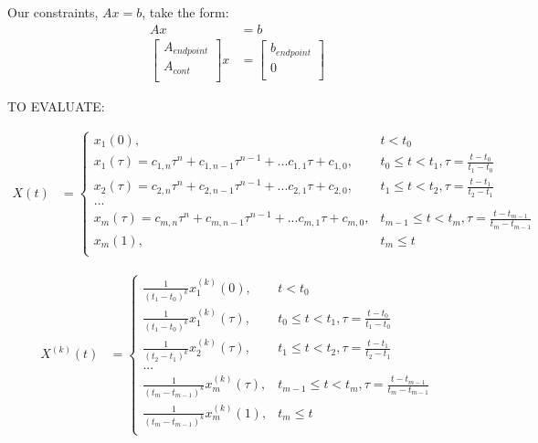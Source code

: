 \documentclass[11pt]{article}
\begin{document}
Our constraints, $Ax = b$, take the form:
\begin{align}
\nonumber Ax &= b \\
\label{eqn: Akeyframes} 
\begin{bmatrix}
A_{endpoint} \\
A_{cont} \\
 \end{bmatrix}
 x 
& = 
 \begin{bmatrix}
b_{endpoint} \\
0 \\
 \end{bmatrix} 
\end{align}



\mbox{} \newline
\mbox{} \newline
TO EVALUATE: \newline

\begin{align*}
X(t) &= 
\begin{cases}
    x_1(0), & t < t_0 \\
    x_1 (\tau) = c_{1, n} \tau^n + c_{1, n-1} \tau^{n-1} + ... c_{1, 1} \tau + c_{1, 0}, & t_0 \le t < t_1, \tau = \frac{t-t_0}{t_1-t_0}  \\
    x_2 (\tau) = c_{2, n} \tau^n + c_{2, n-1} \tau^{n-1} + ... c_{2, 1} \tau + c_{2, 0}, & t_1 \le t < t_2, \tau = \frac{t-t_1}{t_2-t_1}  \\
    ... \\
    x_m (\tau) = c_{m, n} \tau^n + c_{m, n-1} \tau^{n-1} + ... c_{m, 1} \tau + c_{m, 0}, & t_{m-1} \le t < t_m, \tau = \frac{t-t_{m-1}}{t_m-t_{m-1}} \\
    x_m(1), & t_m \le t \\
\end{cases}
\end{align*} 

\begin{align*}
X^{(k)}(t) &= 
\begin{cases}
    \frac{1}{(t_1-t_0)^k} x^{(k)}_1(0), & t < t_0 \\
    \frac{1}{(t_1-t_0)^k} x^{(k)}_1 (\tau) , & t_0 \le t < t_1, \tau = \frac{t-t_0}{t_1-t_0}  \\
    \frac{1}{(t_2-t_1)^k} x^{(k)}_2 (\tau) , & t_1 \le t < t_2, \tau = \frac{t-t_1}{t_2-t_1}  \\
    ... \\
    \frac{1}{(t_m-t_{m-1})^k} x^{(k)}_m (\tau) , & t_{m-1} \le t < t_m, \tau = \frac{t-t_{m-1}}{t_m-t_{m-1}} \\
    \frac{1}{(t_m-t_{m-1})^k} x^{(k)}_m(1), & t_m \le t \\
\end{cases}
\end{align*} 













%
%
\end{document}
